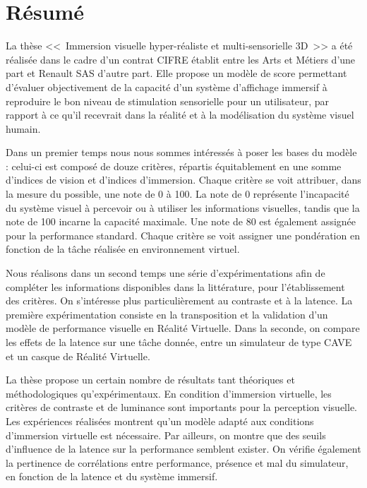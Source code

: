 \chapter*{Résumé}
\par La thèse <<~Immersion visuelle hyper-réaliste et multi-sensorielle 3D~>> a été réalisée dans le cadre d’un contrat CIFRE établit entre les Arts et Métiers d’une part et Renault SAS d’autre part. Elle propose un modèle de score permettant d’évaluer objectivement de la capacité d’un système d’affichage immersif à reproduire le bon niveau de stimulation sensorielle pour un utilisateur, par rapport à ce qu’il recevrait dans la réalité et à la modélisation du système visuel humain.

\par Dans un premier temps nous nous sommes intéressés à poser les bases du modèle : celui-ci est composé de douze critères, répartis équitablement en une somme d’indices de vision et d’indices d’immersion. Chaque critère se voit attribuer, dans la mesure du possible, une note de 0 à 100. La note de 0 représente l’incapacité du système visuel à percevoir ou à utiliser les informations visuelles, tandis que la note de 100 incarne la capacité maximale. Une note de 80 est également assignée pour la performance standard. Chaque critère se voit assigner une pondération en fonction de la tâche réalisée en environnement virtuel.

\par Nous réalisons dans un second temps une série d’expérimentations afin de compléter les informations disponibles dans la littérature, pour l’établissement des critères. On s’intéresse plus particulièrement au contraste et à la latence. La première expérimentation consiste en la transposition et la validation d’un modèle de performance visuelle en Réalité Virtuelle. Dans la seconde, on compare les effets de la latence sur une tâche donnée, entre un simulateur de type CAVE et un casque de Réalité Virtuelle.

\par La thèse propose un certain nombre de résultats tant théoriques et méthodologiques qu’expérimentaux. En condition d’immersion virtuelle, les critères de contraste et de luminance sont importants pour la perception visuelle. Les expériences réalisées montrent qu’un modèle adapté aux conditions d’immersion virtuelle est nécessaire. Par ailleurs, on montre que des seuils d’influence de la latence sur la performance semblent exister. On vérifie également la pertinence de corrélations entre performance, présence et mal du simulateur, en fonction de la latence et du système immersif.


